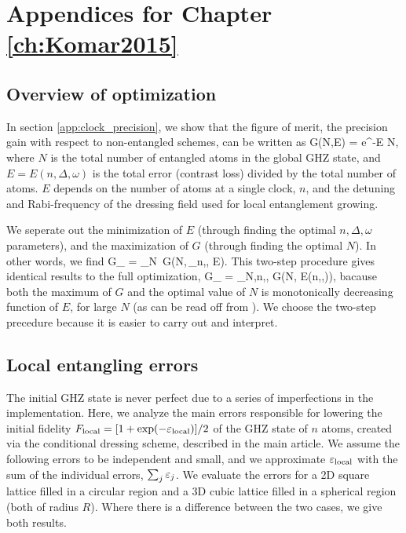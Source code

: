 \chapter{Appendices for Chapter \ref{ch:Komar2015}}
\label{app:Komar2015}

\section{Overview of optimization}
In section \ref{app:clock_precision}, we show that the figure of merit, the
precision gain with respect to non-entangled schemes, can be written as
\bel
\label{eq:G_first}
	G(N,E) = e^{-E N},
\eel
where $N$ is the total number of entangled atoms in the global GHZ state, and
$E = E(n,\Delta,\omega)$ is the total error (contrast loss) divided by the total
number of atoms. $E$ depends on the number of atoms at a single clock, $n$, and the
detuning and Rabi-frequency of the dressing field used for local entanglement
growing.

We seperate out the
minimization of $E$ (through finding the optimal $n, \Delta, \omega$
parameters), and the maximization of $G$ (through finding the optimal $N$). In
other words, we find
\bel
	G_ = \max_N \,G\left(N,\,\min_{n,\Delta,\omega} E\right).
\eel
This two-step procedure gives identical results to the full optimization,
\bel
	G_ = \max_{N,n,\Delta,\omega} G\Big(N, E(n,\Delta,\omega)\Big),
\eel
bacause both the maximum of $G$ and the optimal value of $N$ is
monotonically decreasing function of $E$, for large $N$ (as can be read off from
).
We choose the two-step precedure because it is easier to carry out and
interpret.


\section{Local entangling errors}
\label{app:local_entanging_errors}
The initial GHZ state is never perfect due to a series of imperfections in the
implementation. Here, we analyze the main errors responsible for lowering the
initial fidelity $F_\mathrm{local} = [1+\exp(-\varepsilon_\mathrm{local})]/2$ of the GHZ
state of $n$ atoms, created via the conditional dressing scheme,  described in
the main article. We assume the following errors to be independent and small,
and we approximate $\varepsilon_\mathrm{local}$ with the sum
of the individual errors, $\sum_j \varepsilon_j$. We evaluate the errors for a 2D
square lattice filled in a circular region and a 3D cubic lattice filled in a
spherical region (both of radius $R$). Where there is
a difference between the two cases, we give both results.
 
